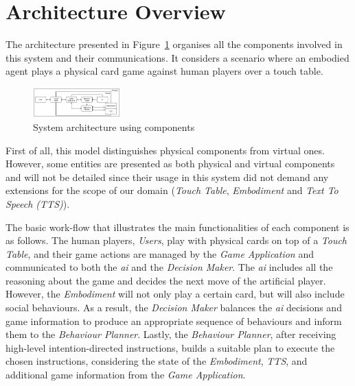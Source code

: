 \section{Architecture Overview}
\label{section:architecture-overview}

The architecture presented in Figure~\ref{fig:architecture} organises all the components involved in this system and their communications.
It considers a scenario where an embodied agent plays a physical card game against human players over a touch table.

\begin{figure}[ht]
  \centering
    \includegraphics[width=0.3\textwidth]{./img/6/architecture}
  \caption{System architecture using components}
\label{fig:architecture}
\end{figure}

First of all, this model distinguishes physical components from virtual ones.
However, some entities are presented as both physical and virtual components and will not be detailed since their usage in this system did not demand any extensions for the scope of our domain (\emph{Touch Table}, \emph{Embodiment} and \emph{Text To Speech (TTS)}).

The basic work-flow that illustrates the main functionalities of each component is as follows.
The human players, \emph{Users}, play with physical cards on top of a \emph{Touch Table}, and their game actions are managed by the \emph{Game Application} and communicated to both the \emph{\ac{ai}} and the \emph{Decision Maker}.
The \emph{\ac{ai}} includes all the reasoning about the game and decides the next move of the artificial player.
However, the \emph{Embodiment} will not only play a certain card, but will also include social behaviours.
As a result, the \emph{Decision Maker} balances the \emph{\ac{ai}} decisions and game information to produce an appropriate sequence of behaviours and inform them to the \emph{Behaviour Planner}.
Lastly, the \emph{Behaviour Planner}, after receiving high-level intention-directed instructions, builds a suitable plan to execute the chosen instructions, considering the state of the \emph{Embodiment}, \emph{TTS}, and additional game information from the \emph{Game Application}.


